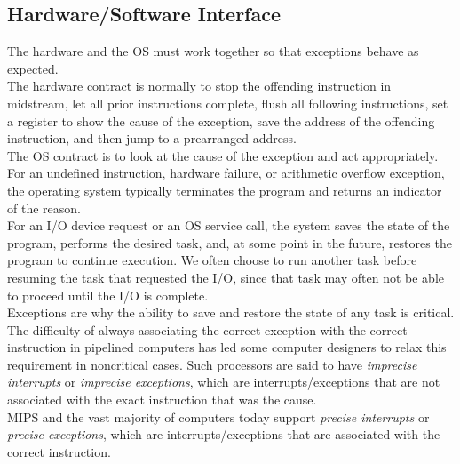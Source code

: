 \documentclass[12pt]{article}
\theoremstyle{definition}
\begin{document}
  \subsection{Hardware/Software Interface}
  The hardware and the OS must work together so that exceptions behave as expected. \\

  The hardware contract is normally to stop the offending instruction in midstream, let all prior instructions complete, flush all following instructions, set a register to show the cause of the exception, save the address of the offending instruction, and then jump to a prearranged address. \\

  The OS contract is to look at the cause of the exception and act appropriately. \\
  For an undefined instruction, hardware failure, or arithmetic overflow exception, the operating system typically terminates the program and returns an indicator of the reason. \\
  For an I/O device request or an OS service call, the system saves the state of the program, performs the desired task, and, at some point in the future, restores the program to continue execution.
  We often choose to run another task before resuming the task that requested the I/O, since that task may often not be able to proceed until the I/O is complete. \\

  Exceptions are why the ability to save and restore the state of any task is critical. \\

  The difficulty of always associating the correct exception with the correct instruction in pipelined computers has led some computer designers to relax this requirement in noncritical cases.
  Such processors are said to have \emph{imprecise interrupts} or \emph{imprecise exceptions},
  which are interrupts/exceptions that are not associated with the exact instruction that was the cause. \\
  MIPS and the vast majority of computers today support \emph{precise interrupts} or \emph{precise exceptions}, which are interrupts/exceptions that are associated with the correct instruction.

  \newpage
\end{document}
